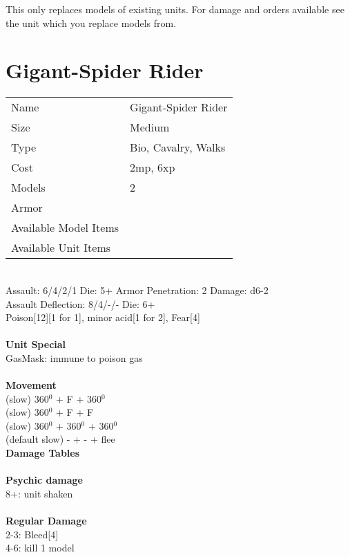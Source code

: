 This only replaces models of existing units. For damage and orders available see the unit which you replace models from.



\pagebreak

\section{ Gigant-Spider Rider }

\begin{tabular}{ll}
  Name & Gigant-Spider Rider \\
  Size & Medium\\
  Type & Bio, Cavalry, Walks\\
  Cost & 2mp, 6xp\\
  Models & 2\\
  Armor & \\
  Available Model Items &  \\
  Available Unit Items &  \\
\end{tabular}

\ \\
Assault: 6/4/2/1 Die: 5+ Armor Penetration: 2 Damage: d6-2 \\
Assault Deflection: 8/4/-/- Die: 6+\\
\indent Poison[12][1 for 1], minor acid[1 for 2], Fear[4] \\
\ \\

{\bf Unit Special} \\
GasMask: immune to poison gas
\ \\


\ \\ {\bf Movement } \\
(slow) 360$^0$ + F + 360$^0$ \\
(slow) 360$^0$ + F + F \\
(slow) 360$^0$ + 360$^0$ + 360$^0$ \\
(default slow) - + - + flee \\



{\bf Damage Tables} \\
\ \\ {\bf Psychic damage } \\
8+: unit shaken \\
\ \\ {\bf Regular Damage } \\
2-3: Bleed[4] \\
4-6: kill 1 model \\


